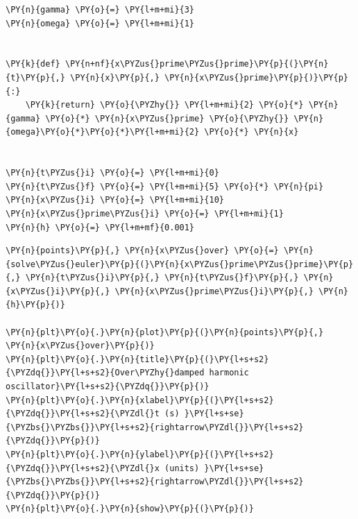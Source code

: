     \begin{tcolorbox}[breakable, size=fbox, boxrule=1pt, pad at break*=1mm,colback=cellbackground, colframe=cellborder]
\begin{Verbatim}[commandchars=\\\{\}]
\PY{n}{gamma} \PY{o}{=} \PY{l+m+mi}{3}
\PY{n}{omega} \PY{o}{=} \PY{l+m+mi}{1}


\PY{k}{def} \PY{n+nf}{x\PYZus{}prime\PYZus{}prime}\PY{p}{(}\PY{n}{t}\PY{p}{,} \PY{n}{x}\PY{p}{,} \PY{n}{x\PYZus{}prime}\PY{p}{)}\PY{p}{:}
    \PY{k}{return} \PY{o}{\PYZhy{}} \PY{l+m+mi}{2} \PY{o}{*} \PY{n}{gamma} \PY{o}{*} \PY{n}{x\PYZus{}prime} \PY{o}{\PYZhy{}} \PY{n}{omega}\PY{o}{*}\PY{o}{*}\PY{l+m+mi}{2} \PY{o}{*} \PY{n}{x}


\PY{n}{t\PYZus{}i} \PY{o}{=} \PY{l+m+mi}{0}
\PY{n}{t\PYZus{}f} \PY{o}{=} \PY{l+m+mi}{5} \PY{o}{*} \PY{n}{pi}
\PY{n}{x\PYZus{}i} \PY{o}{=} \PY{l+m+mi}{10}
\PY{n}{x\PYZus{}prime\PYZus{}i} \PY{o}{=} \PY{l+m+mi}{1}
\PY{n}{h} \PY{o}{=} \PY{l+m+mf}{0.001}
\end{Verbatim}
\end{tcolorbox}

    \begin{tcolorbox}[breakable, size=fbox, boxrule=1pt, pad at break*=1mm,colback=cellbackground, colframe=cellborder]
\begin{Verbatim}[commandchars=\\\{\}]
\PY{n}{points}\PY{p}{,} \PY{n}{x\PYZus{}over} \PY{o}{=} \PY{n}{solve\PYZus{}euler}\PY{p}{(}\PY{n}{x\PYZus{}prime\PYZus{}prime}\PY{p}{,} \PY{n}{t\PYZus{}i}\PY{p}{,} \PY{n}{t\PYZus{}f}\PY{p}{,} \PY{n}{x\PYZus{}i}\PY{p}{,} \PY{n}{x\PYZus{}prime\PYZus{}i}\PY{p}{,} \PY{n}{h}\PY{p}{)}

\PY{n}{plt}\PY{o}{.}\PY{n}{plot}\PY{p}{(}\PY{n}{points}\PY{p}{,} \PY{n}{x\PYZus{}over}\PY{p}{)}
\PY{n}{plt}\PY{o}{.}\PY{n}{title}\PY{p}{(}\PY{l+s+s2}{\PYZdq{}}\PY{l+s+s2}{Over\PYZhy{}damped harmonic oscillator}\PY{l+s+s2}{\PYZdq{}}\PY{p}{)}
\PY{n}{plt}\PY{o}{.}\PY{n}{xlabel}\PY{p}{(}\PY{l+s+s2}{\PYZdq{}}\PY{l+s+s2}{\PYZdl{}t (s) }\PY{l+s+se}{\PYZbs{}\PYZbs{}}\PY{l+s+s2}{rightarrow\PYZdl{}}\PY{l+s+s2}{\PYZdq{}}\PY{p}{)}
\PY{n}{plt}\PY{o}{.}\PY{n}{ylabel}\PY{p}{(}\PY{l+s+s2}{\PYZdq{}}\PY{l+s+s2}{\PYZdl{}x (units) }\PY{l+s+se}{\PYZbs{}\PYZbs{}}\PY{l+s+s2}{rightarrow\PYZdl{}}\PY{l+s+s2}{\PYZdq{}}\PY{p}{)}
\PY{n}{plt}\PY{o}{.}\PY{n}{show}\PY{p}{(}\PY{p}{)}
\end{Verbatim}
\end{tcolorbox}

